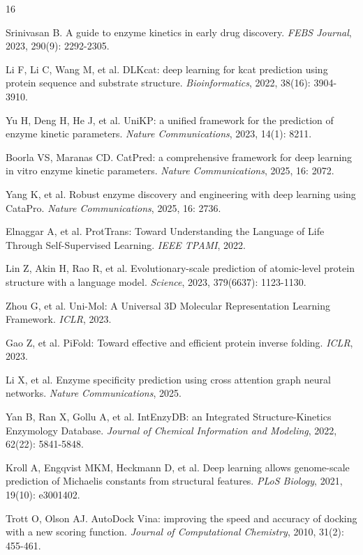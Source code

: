 \documentclass[11pt]{article}
\begin{document}
\begin{thebibliography}{16}

Srinivasan B. A guide to enzyme kinetics in early drug discovery. \textit{FEBS Journal}, 2023, 290(9): 2292-2305.

Li F, Li C, Wang M, et al. DLKcat: deep learning for kcat prediction using protein sequence and substrate structure. \textit{Bioinformatics}, 2022, 38(16): 3904-3910.

Yu H, Deng H, He J, et al. UniKP: a unified framework for the prediction of enzyme kinetic parameters. \textit{Nature Communications}, 2023, 14(1): 8211.

Boorla VS, Maranas CD. CatPred: a comprehensive framework for deep learning in vitro enzyme kinetic parameters. \textit{Nature Communications}, 2025, 16: 2072.

Yang K, et al. Robust enzyme discovery and engineering with deep learning using CataPro. \textit{Nature Communications}, 2025, 16: 2736.

Elnaggar A, et al. ProtTrans: Toward Understanding the Language of Life Through Self-Supervised Learning. \textit{IEEE TPAMI}, 2022.

Lin Z, Akin H, Rao R, et al. Evolutionary-scale prediction of atomic-level protein structure with a language model. \textit{Science}, 2023, 379(6637): 1123-1130.

Zhou G, et al. Uni-Mol: A Universal 3D Molecular Representation Learning Framework. \textit{ICLR}, 2023.

Gao Z, et al. PiFold: Toward effective and efficient protein inverse folding. \textit{ICLR}, 2023.

Li X, et al. Enzyme specificity prediction using cross attention graph neural networks. \textit{Nature Communications}, 2025.

Yan B, Ran X, Gollu A, et al. IntEnzyDB: an Integrated Structure-Kinetics Enzymology Database. \textit{Journal of Chemical Information and Modeling}, 2022, 62(22): 5841-5848.

Kroll A, Engqvist MKM, Heckmann D, et al. Deep learning allows genome-scale prediction of Michaelis constants from structural features. \textit{PLoS Biology}, 2021, 19(10): e3001402.

Trott O, Olson AJ. AutoDock Vina: improving the speed and accuracy of docking with a new scoring function. \textit{Journal of Computational Chemistry}, 2010, 31(2): 455-461.


\end{thebibliography}
\end{document}
